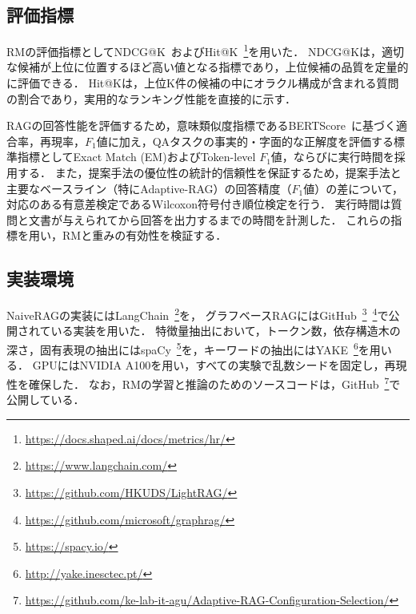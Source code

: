 \subsection{評価指標} \label{sec4.6}
RMの評価指標としてNDCG@K~\cite{JarvelinKalervo02}およびHit@K~\footnote{\url{https://docs.shaped.ai/docs/metrics/hr/}}を用いた．
NDCG@Kは，適切な候補が上位に位置するほど高い値となる指標であり，上位候補の品質を定量的に評価できる．
Hit@Kは，上位K件の候補の中にオラクル構成が含まれる質問の割合であり，実用的なランキング性能を直接的に示す．

RAGの回答性能を評価するため，意味類似度指標であるBERTScore~\cite{zhang20}に基づく適合率，再現率，$F_1$値に加え，QAタスクの事実的・字面的な正解度を評価する標準指標としてExact Match (EM)およびToken-level $F_1$値，ならびに実行時間を採用する．
また，提案手法の優位性の統計的信頼性を保証するため，提案手法と主要なベースライン（特にAdaptive-RAG）の回答精度（$F_1$値）の差について，対応のある有意差検定であるWilcoxon符号付き順位検定を行う．
実行時間は質問と文書が与えられてから回答を出力するまでの時間を計測した．
これらの指標を用い，RMと重みの有効性を検証する．

\subsection{実装環境} \label{sec4.7}
NaiveRAGの実装にはLangChain~\footnote{\url{https://www.langchain.com/}}を，
グラフベースRAGにはGitHub~\footnote{\url{https://github.com/HKUDS/LightRAG/}}~\footnote{\url{https://github.com/microsoft/graphrag/}}で公開されている実装を用いた．
特徴量抽出において，トークン数，依存構造木の深さ，固有表現の抽出にはspaCy~\footnote{\url{https://spacy.io/}}を，キーワードの抽出にはYAKE~\footnote{\url{http://yake.inesctec.pt/}}を用いる．
GPUにはNVIDIA A100を用い，すべての実験で乱数シードを固定し，再現性を確保した．
なお，RMの学習と推論のためのソースコードは，GitHub~\footnote{\url{https://github.com/ke-lab-it-agu/Adaptive-RAG-Configuration-Selection/}}で公開している． 